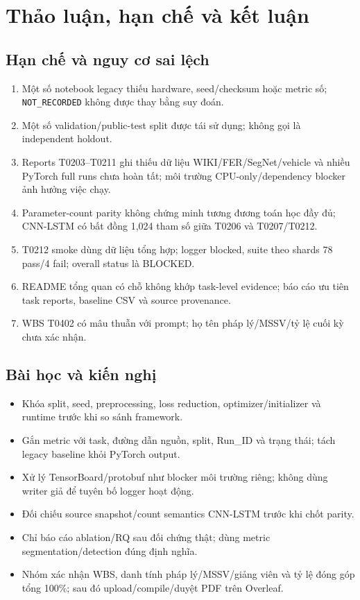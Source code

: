 \chapter{Thảo luận, hạn chế và kết luận}
\section{Hạn chế và nguy cơ sai lệch}
\begin{enumerate}
\item Một số notebook legacy thiếu hardware, seed/checksum hoặc metric số; \texttt{NOT\_RECORDED} không được thay bằng suy đoán.
\item Một số validation/public-test split được tái sử dụng; không gọi là independent holdout.
\item Reports T0203--T0211 ghi thiếu dữ liệu WIKI/FER/SegNet/vehicle và nhiều PyTorch full runs chưa hoàn tất; môi trường CPU-only/dependency blocker ảnh hưởng việc chạy.
\item Parameter-count parity không chứng minh tương đương toán học đầy đủ; CNN-LSTM có bất đồng 1,024 tham số giữa T0206 và T0207/T0212.
\item T0212 smoke dùng dữ liệu tổng hợp; logger blocked, suite theo shards 78 pass/4 fail; overall status là BLOCKED.
\item README tổng quan có chỗ không khớp task-level evidence; báo cáo ưu tiên task reports, baseline CSV và source provenance.
\item WBS T0402 có mâu thuẫn với prompt; họ tên pháp lý/MSSV/tỷ lệ cuối kỳ chưa xác nhận.
\end{enumerate}

\section{Bài học và kiến nghị}
\begin{itemize}
\item Khóa split, seed, preprocessing, loss reduction, optimizer/initializer và runtime trước khi so sánh framework.
\item Gắn metric với task, đường dẫn nguồn, split, Run\_ID và trạng thái; tách legacy baseline khỏi PyTorch output.
\item Xử lý TensorBoard/protobuf như blocker môi trường riêng; không dùng writer giả để tuyên bố logger hoạt động.
\item Đối chiếu source snapshot/count semantics CNN-LSTM trước khi chốt parity.
\item Chỉ báo cáo ablation/RQ sau đối chứng thật; dùng metric segmentation/detection đúng định nghĩa.
\item Nhóm xác nhận WBS, danh tính pháp lý/MSSV/giảng viên và tỷ lệ đóng góp tổng 100\%; sau đó upload/compile/duyệt PDF trên Overleaf.
\end{itemize}

